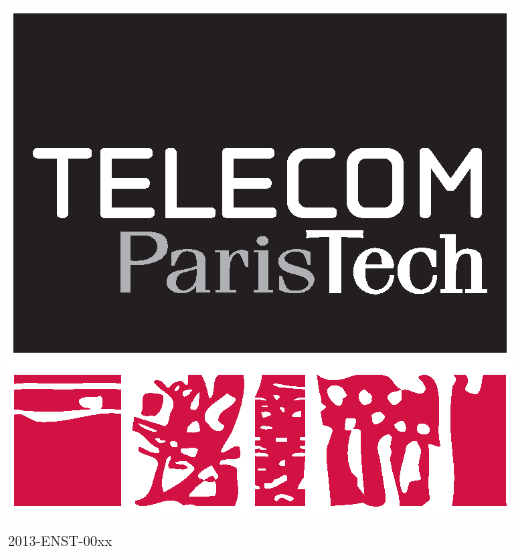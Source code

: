


\pagestyle{empty}

\AddToShipoutPicture*{\BackgroundPicCover}

\begin{flushright}

\includegraphics[scale=0.3]{img/logos/telecom.eps}

{\small {2013-ENST-00xx~~~~}}

\end{flushright}

